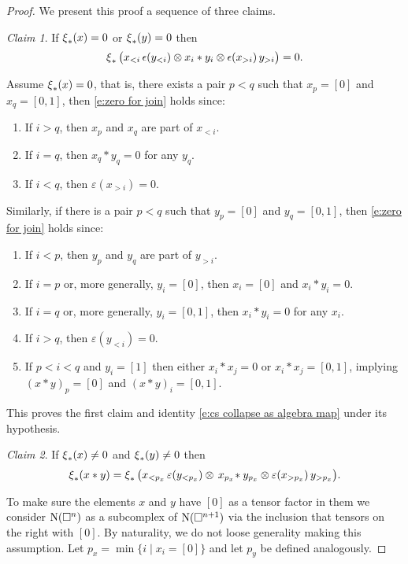 \begin{proof}
	We present this proof a sequence of three claims. \newline

	\noindent \textit{Claim 1}.
	If $\operatorname{\xi}_\ast(x) = 0$ or $\operatorname{\xi}_\ast(y) = 0$ then
	\begin{equation} \label{e:zero for join}
	\operatorname{\xi}_\ast \big( x_{<i}\, \epsilon(y_{<i}) \otimes x_i \ast y_i \otimes \epsilon(x_{>i}) \, y_{>i} \big) = 0.
	\end{equation}

	Assume $\operatorname{\xi}_\ast(x) = 0$, that is, there exists a pair $p < q$ such that $x_p = [0]$ and $x_q = [0,1]$, then \eqref{e:zero for join} holds since:
	\begin{enumerate}
		\item If $i > q$, then $x_p$ and $x_q$ are part of $x_{<i}$.
		\item If $i = q$, then $x_q \ast y_q = 0$ for any $y_q$.
		\item If $i < q$, then $\varepsilon(x_{>i}) = 0$.
	\end{enumerate}
	Similarly, if there is a pair $p < q$ such that $y_p = [0]$ and $y_q = [0,1]$,  then \eqref{e:zero for join} holds since:
	\begin{enumerate}
		\item If $i < p$, then $y_p$ and $y_q$ are part of $y_{>i}$.
		\item If $i = p$ or, more generally, $y_i = [0]$, then $x_i = [0]$ and $x_i \ast y_i = 0$.
		\item If $i = q$ or, more generally, $y_i = [0,1]$, then $x_i \ast y_i = 0$ for any $x_i$.
		\item If $i > q$, then $\varepsilon(y_{<i}) = 0$.
		\item If $p < i < q$ and $y_i = [1]$ then either $x_i \ast x_j = 0$ or $x_i \ast x_j = [0,1]$, implying $(x \ast y)_p = [0]$ and $(x \ast y)_i = [0,1]$.
	\end{enumerate}
	This proves the first claim and identity \eqref{e:cs collapse as algebra map} under its hypothesis. \newline

	\noindent \textit{Claim 2}.
	If $\operatorname{\xi}_\ast(x) \neq 0$ and $\operatorname{\xi}_\ast(y) \neq 0$ then
	\[
	\operatorname{\xi}_\ast(x \ast y) = \operatorname{\xi}_\ast \big( x_{<p_x} \, \varepsilon(y_{<p_x}) \otimes \, x_{p_x} \! \ast y_{p_x} \otimes \varepsilon(x_{>p_x}) \, y_{>p_x} \big).
	\]

	To make sure the elements $x$ and $y$ have $[0]$ as a tensor factor in them we consider $\operatorname{N}(\square^n)$ as a subcomplex of $\operatorname{N}(\square^{n+1})$ via the inclusion that tensors on the right with $[0]$.
	By naturality, we do not loose generality making this assumption.
	Let $p_x = \min \big\{ i \mid x_i = [0] \big\}$ and let $p_y$ be defined analogously.


\end{proof}
